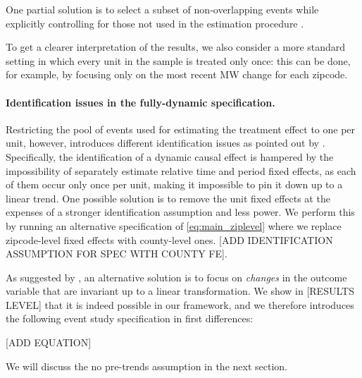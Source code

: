 One partial solution is to select a subset of non-overlapping events while explicitly controlling for those not used in the estimation procedure \parencite{dube2016minimum}. 

To get a clearer interpretation of the results, we also consider a more standard setting in which every unit in the sample is treated only once: this can be done, for example, by focusing only on the most recent MW change for each zipcode.   


\paragraph{Identification issues in the fully-dynamic specification.} Restricting the pool of events used for estimating the treatment effect to one per unit, however, introduces different identification issues as pointed out by \textcite{borusyak2017revisiting}. Specifically, the identification of a dynamic causal effect is hampered by the impossibility of separately estimate relative time and period fixed effects, as each of them occur only once per unit, making it impossible to pin it down up to a linear trend. One possible solution is to remove the unit fixed effects at the expenses of a stronger identification assumption and less power. We perform this by running an alternative specification of \autoref{eq:main_ziplevel} where we replace zipcode-level fixed effects with county-level ones. [ADD IDENTIFICATION ASSUMPTION FOR SPEC WITH COUNTY FE]. 

As suggested by \textcite{borusyak2017revisiting}, an alternative solution is to focus on \textit{changes} in the outcome variable that are invariant up to a linear transformation. We show in [RESULTS LEVEL] that it is indeed possible in our framework, and we therefore introduces the following event study specification in first differences: 

[ADD EQUATION]



We will discuss the no pre-trends assumption in the next section.